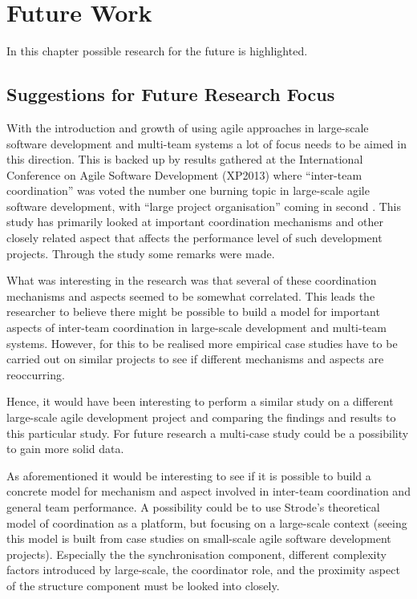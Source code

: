 \chapter{Future Work}


\minitoc

In this chapter possible research for the future is highlighted.
\newpage

\section{Suggestions for Future Research Focus}

With the introduction and growth of using agile approaches in large-scale software development and multi-team systems a lot of focus needs to be aimed in this direction. This is backed up by results gathered at the International Conference on Agile Software Development (XP2013) where ``inter-team coordination'' was voted the number one burning topic in large-scale agile software development, with ``large project organisation'' coming in second \cite{Dingsoyr2013b}. This study has primarily looked at important coordination mechanisms and other closely related aspect that affects the performance level of such development projects. Through the study some remarks were made.

What was interesting in the research was that several of these coordination mechanisms and aspects seemed to be somewhat correlated. This leads the researcher to believe there might be possible to build a model for important aspects of inter-team coordination in large-scale development and multi-team systems. However, for this to be realised more empirical case studies have to be carried out on similar projects to see if different mechanisms and aspects are reoccurring.

Hence, it would have been interesting to perform a similar study on a different large-scale agile development project and comparing the findings and results to this particular study. For future research a multi-case study could be a possibility to gain more solid data.

As aforementioned it would be interesting to see if it is possible to build a concrete model for mechanism and aspect involved in inter-team coordination and general team performance. A possibility could be to use Strode's theoretical model of coordination as a platform, but focusing on a large-scale context (seeing this model is built from case studies on small-scale agile software development projects). Especially the the synchronisation component, different complexity factors introduced by large-scale, the coordinator role, and the proximity aspect of the structure component must be looked into closely.

